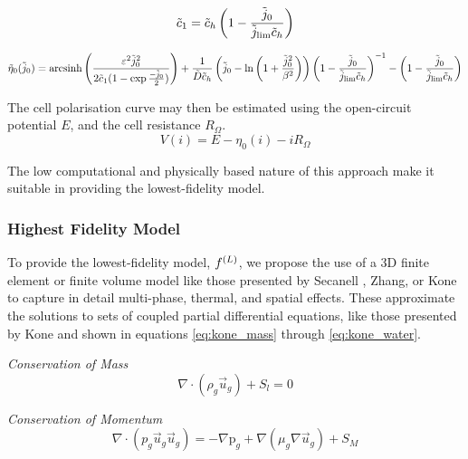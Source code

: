 \begin{equation}
	\tilde{c}_1 = \tilde{c}_h \left(1 - \frac{\tilde{j}_0}{\tilde{j}_{\text{lim}}\tilde{c}_h}\right)\label{eq:oxyconc}
\end{equation}

\begin{equation}
	\tilde{\eta}_0(\tilde{j}_0) = \text{arcsinh}\left(\frac{\varepsilon^2 \tilde{j}_0^2}{2 \tilde{c}_1 (1 - \exp{\frac{-\tilde{j}_0}{2}})}\right)
	+ \frac{1}{\tilde{D}\tilde{c}_h}\left(\tilde{j}_0 - \ln\left(1 + \frac{\tilde{j}_0^2}{\beta^2}\right)\right)\left(1 - \frac{\tilde{j}_0}{\tilde{j}_{\text{lim}}\tilde{c}_h}\right)^{-1}
	-\left(1 - \frac{\tilde{j}_0}{\tilde{j}_{\text{lim}}\tilde{c}_h}\right)
	\label{eq:kulfull}
\end{equation}

The cell polarisation curve may then be estimated using the open-circuit potential $E$, and the cell resistance \(R_{\Omega}\).
\begin{equation}
	V(i) = E - \eta_0(i) - iR_\Omega
\end{equation}

The low computational and physically based nature of this approach make it suitable in providing the lowest-fidelity model.

\subsubsection{Highest Fidelity Model}

To provide the lowest-fidelity model, $f^{(L)}$, we propose the use of a 3D finite element or finite volume model like those presented by Secanell \etal, Zhang, or Kone \etal \cite{secanellOpenFCSTOpenSourceMathematical2014, zhangOpenFuelCell2NewComputational2024, koneOpenSourceToolboxPEM2018} to capture in detail multi-phase, thermal, and spatial effects. These approximate the solutions to sets of coupled partial differential equations, like those presented by Kone \etal and shown in equations \ref{eq:kone_mass} through \ref{eq:kone_water}.

\textit{Conservation of Mass}
\begin{equation}
	\nabla \cdot (\rho_g \vec{u}_g) + S_l = 0 \label{eq:kone_mass}
\end{equation}

\textit{Conservation of Momentum}
\begin{equation}
	\nabla \cdot (p_g \vec{u}_g \vec{u}_g) = -\nabla \text{p}_g + \nabla (\mu_g \nabla \vec{u}_g) + S_M
\end{equation}


